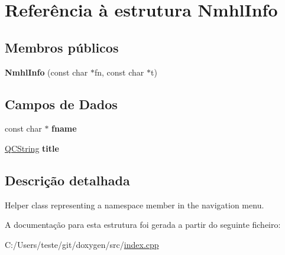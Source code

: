 \hypertarget{struct_nmhl_info}{\section{Referência à estrutura Nmhl\-Info}
\label{struct_nmhl_info}
}
\subsection*{Membros públicos}
\begin{DoxyCompactItemize}
\item 
\hypertarget{struct_nmhl_info_a7654f2fda52a1232aeb52a61432769b9}{{\bfseries Nmhl\-Info} (const char $\ast$fn, const char $\ast$t)}\label{struct_nmhl_info_a7654f2fda52a1232aeb52a61432769b9}

\end{DoxyCompactItemize}
\subsection*{Campos de Dados}
\begin{DoxyCompactItemize}
\item 
\hypertarget{struct_nmhl_info_a6a2fc0c236288b07ce5bd1335ca89fa2}{const char $\ast$ {\bfseries fname}}\label{struct_nmhl_info_a6a2fc0c236288b07ce5bd1335ca89fa2}

\item 
\hypertarget{struct_nmhl_info_a42bb80709d086df855babb087e63794b}{\hyperlink{class_q_c_string}{Q\-C\-String} {\bfseries title}}\label{struct_nmhl_info_a42bb80709d086df855babb087e63794b}

\end{DoxyCompactItemize}


\subsection{Descrição detalhada}
Helper class representing a namespace member in the navigation menu. 

A documentação para esta estrutura foi gerada a partir do seguinte ficheiro\-:\begin{DoxyCompactItemize}
\item 
C\-:/\-Users/teste/git/doxygen/src/\hyperlink{index_8cpp}{index.\-cpp}\end{DoxyCompactItemize}
